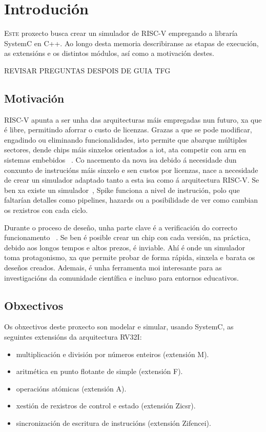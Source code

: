 \chapter{Introdución}
\label{chap:introducion}

\lettrine{E}{ste} proxecto busca crear un simulador de RISC-V empregando a libraría SystemC en C++. Ao longo desta memoria describiranse as etapas de execución, as extensións e os distintos módulos, así como a motivación destes.

 REVISAR PREGUNTAS DESPOIS DE GUIA TFG

\section{Motivación}
\label{sec:motivación}
RISC-V apunta a ser unha das arquitecturas máis empregadas nun futuro, xa que é libre, permitindo aforrar o custo de licenzas. Grazas a que se pode modificar, engadindo ou eliminando funcionalidades, isto permite que abarque múltiples sectores, dende \gls{chips} máis sinxelos orientados a \acrfull{iot}, ata competir con \acrshort{arm} en sistemas embebidos ~\cite{RISCV_IoT,RISCV_vsARM}. Co nacemento da nova \acrfull{isa} debido á necesidade dun conxunto de instrucións máis sinxelo e sen custos por licenzas, nace a necesidade de crear un simulador adaptado tanto a esta \acrshort{isa} como á arquitectura RISC-V. Se ben xa existe un simulador~\cite{sim_spike}, Spike funciona a nivel de instrución, polo que faltarían detalles como pipelines, \gls{hazards} ou a posibilidade de ver como cambian os \gls{rexistros} con cada ciclo.

Durante o proceso de deseño, unha parte clave é a verificación do correcto funcionamento ~\cite{ChipVerify_verification,RISCV_verification}. Se ben é posible crear un chip con cada versión, na práctica, debido aos longos tempos e altos prezos, é inviable. Ahí é onde un simulador toma protagonismo, xa que permite probar de forma rápida, sinxela e barata os deseños creados. Ademais, é unha ferramenta moi interesante para as investigacións da comunidade científica e incluso para entornos educativos.

\section{Obxectivos}
\label{sec:obxectivos}
Os obxectivos deste proxecto son modelar e simular, usando SystemC, as seguintes extensións da arquitectura RV32I: 

\begin{itemize}
    \item multiplicación e división por números enteiros (extensión M).
    \item aritmética en punto flotante de simple (extensión F).
    \item operacións atómicas  (extensión A).
    \item xestión de rexistros de control e estado (extensión Zicsr).
    \item sincronización de escritura de instrucións (extensión Zifencei).
\end{itemize}

